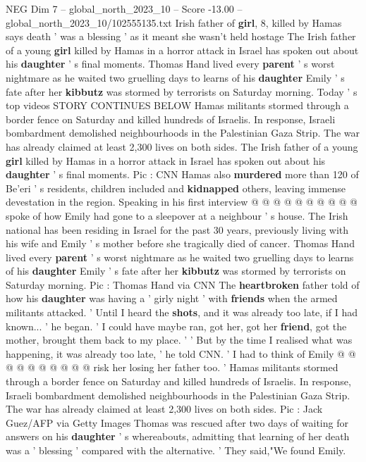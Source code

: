 \begin{textsample}{NEG Dim 7 – global\_north\_2023\_10 – Score -13.00 – global\_north\_2023\_10/102555135.txt}  \label{ex:f7_neg_023}
Irish father of \textbf{girl}, 8, killed by Hamas says death ' was a blessing ' as it meant she wasn't held hostage The Irish father of a young \textbf{girl} killed by Hamas in a horror attack in Israel has spoken out about his \textbf{daughter} ' s final moments.
Thomas Hand lived every \textbf{parent} ' s worst nightmare as he waited two gruelling days to learns of his \textbf{daughter} Emily ' s fate after her \textbf{kibbutz} was stormed by terrorists on Saturday morning.
Today ' s top videos STORY CONTINUES BELOW Hamas militants stormed through a border fence on Saturday and killed hundreds of Israelis.
In response, Israeli bombardment demolished neighbourhoods in the Palestinian Gaza Strip.
The war has already claimed at least 2,300 lives on both sides.
The Irish father of a young \textbf{girl} killed by Hamas in a horror attack in Israel has spoken out about his \textbf{daughter} ' s final moments.
Pic : CNN Hamas also \textbf{murdered} more than 120 of Be'eri ' s residents, children included and \textbf{kidnapped} others, leaving immense devestation in the region.
Speaking in his first interview @ @ @ @ @ @ @ @ @ @ spoke of how Emily had gone to a sleepover at a neighbour ' s house.
The Irish national has been residing in Israel for the past 30 years, previously living with his wife and Emily ' s mother before she tragically died of cancer.
Thomas Hand lived every \textbf{parent} ' s worst nightmare as he waited two gruelling days to learns of his \textbf{daughter} Emily ' s fate after her \textbf{kibbutz} was stormed by terrorists on Saturday morning.
Pic : Thomas Hand via CNN The \textbf{heartbroken} father told of how his \textbf{daughter} was having a ' girly night ' with \textbf{friends} when the armed militants attacked. ' Until I heard the \textbf{shots}, and it was already too late, if I had known... ' he began. ' I could have maybe ran, got her, got her \textbf{friend}, got the mother, brought them back to my place. ' ' But by the time I realised what was happening, it was already too late, ' he told CNN. ' I had to think of Emily @ @ @ @ @ @ @ @ @ @ risk her losing her father too. ' Hamas militants stormed through a border fence on Saturday and killed hundreds of Israelis.
In response, Israeli bombardment demolished neighbourhoods in the Palestinian Gaza Strip.
The war has already claimed at least 2,300 lives on both sides.
Pic : Jack Guez/AFP via Getty Images Thomas was rescued after two days of waiting for answers on his \textbf{daughter} ' s whereabouts, admitting that learning of her death was a ' blessing ' compared with the alternative. ' They said,"We found Emily.

\end{textsample}
